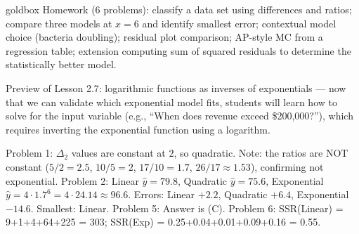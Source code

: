 \documentclass[10pt]{article}
\begin{document}
\begin{skillbox}{goldbox}
Homework (6 problems): classify a data set using differences and ratios; compare three models
at $x = 6$ and identify smallest error; contextual model choice (bacteria doubling); residual
plot comparison; AP-style MC from a regression table; extension computing sum of squared
residuals to determine the statistically better model.

Preview of Lesson 2.7: logarithmic functions as inverses of exponentials --- now that we can
validate which exponential model fits, students will learn how to solve for the input variable
(e.g., ``When does revenue exceed \$200{,}000?''), which requires inverting the exponential
function using a logarithm.
\end{skillbox}

\begin{teachernote}[Homework]
Problem 1: $\Delta_2$ values are constant at $2$, so quadratic. Note: the ratios are NOT
constant ($5/2=2.5$, $10/5=2$, $17/10=1.7$, $26/17\approx1.53$), confirming not exponential.
Problem 2: Linear $\hat{y}=79.8$, Quadratic $\hat{y}=75.6$, Exponential $\hat{y}=4\cdot1.7^6=4\cdot24.14\approx96.6$.
Errors: Linear $+2.2$, Quadratic $+6.4$, Exponential $-14.6$. Smallest: Linear.
Problem 5: Answer is (C). Problem 6: SSR(Linear) = 9+1+4+64+225 = 303; SSR(Exp) = 0.25+0.04+0.01+0.09+0.16 = 0.55.
\end{teachernote}
\end{document}
